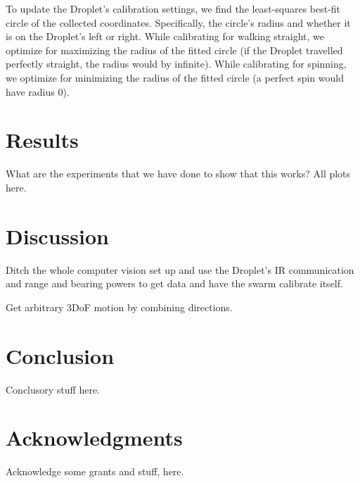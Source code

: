 \documentclass[letterpaper, 10pt, conference]{ieeeconf}
\begin{document}
To update the Droplet's calibration settings, we find the least-squares best-fit circle of the collected coordinates. Specifically, the circle's radius and whether it is on the Droplet's left or right. While calibrating for walking straight, we optimize for maximizing the radius of the fitted circle (if the Droplet travelled perfectly straight, the radius would by infinite). While calibrating for spinning, we optimize for minimizing the radius of the fitted circle (a perfect spin would have radius 0).

\section{Results}
What are the experiments that we have done to show that this works? All plots here.


\section{Discussion}
Ditch the whole computer vision set up and use the Droplet's IR communication and range and bearing powers to get data and have the swarm calibrate itself.

Get arbitrary 3DoF motion by combining directions.

\section{Conclusion}
Conclusory stuff here.

\section*{Acknowledgments}
Acknowledge some grants and stuff, here.



\end{document}
